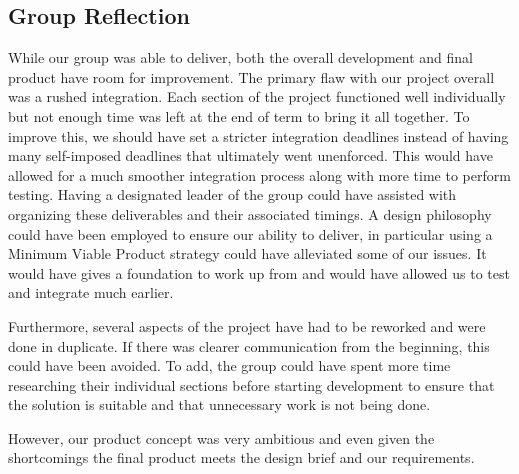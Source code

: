 \subsection{Group Reflection}

While our group was able to deliver, both the overall development and final product have room for improvement.
The primary flaw with our project overall was a rushed integration.
Each section of the project functioned well individually but not enough time was left at the end of term to bring it all together.
To improve this, we should have set a stricter integration deadlines instead of having many self-imposed deadlines that ultimately went unenforced.
This would have allowed for a much smoother integration process along with more time to perform testing.
Having a designated leader of the group could have assisted with organizing these deliverables and their associated timings.
A design philosophy could have been employed to ensure our ability to deliver,
in particular using a Minimum Viable Product strategy could have alleviated some of our issues.
It would have gives a foundation to work up from and would have allowed us to test and integrate much earlier.

Furthermore, several aspects of the project have had to be reworked and were done in duplicate.
If there was clearer communication from the beginning, this could have been avoided.
To add, the group could have spent more time researching their individual sections before starting development to ensure that the solution is suitable
and that unnecessary work is not being done.

However, our product concept was very ambitious and even given the shortcomings the final product meets the design brief and our requirements.